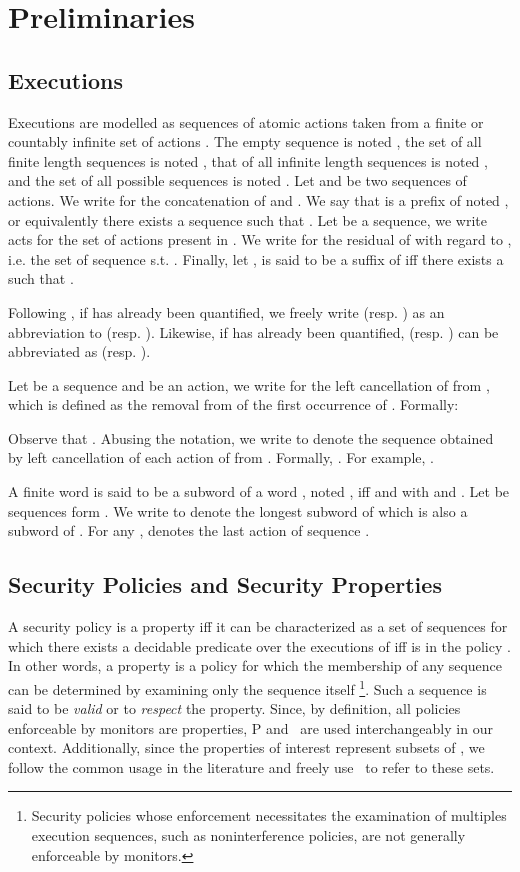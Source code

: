 \documentclass[12pt]{article}
\begin{document}
\section{Preliminaries}\label{sec:preliminaries}

\subsection{Executions}
Executions are modelled as sequences of atomic actions taken from a finite or countably infinite set of actions .  The empty sequence is noted , the set of all finite length sequences is noted , that of all infinite length sequences is noted , and the set of all possible sequences is noted . Let  and  be two sequences of actions.
We write  for the concatenation of  and . We say that  is a prefix of  noted , or equivalently    there exists a sequence  such that . Let  be a sequence, we write acts  for the set of actions  present in . We write  for the residual of  with regard to , i.e. the set of sequence  s.t. . Finally, let ,  is  said to be a suffix of  iff there exists a  such that .

Following \cite{nonsafetyJournal}, if  has already been quantified, we freely write  (resp. ) as an abbreviation to  (resp. ).  Likewise, if  has already been quantified,   (resp. ) can be abbreviated as  (resp. ).

Let  be a sequence and  be an action, we write  for the left cancellation of  from , which is defined as the removal from  of the first occurrence of .  Formally:




Observe that .  Abusing the notation, we write  to denote the sequence obtained by left cancellation of each action of  from . Formally, . For example, .

A finite word  is said to be a subword of a word , noted , iff  and  with  and .  Let  be sequences form . We write  to denote the longest subword of  which is also a subword of . For any ,  denotes the last action of sequence .



\subsection{Security Policies and Security Properties}

A security policy  is a property iff it can be characterized as a set of sequences for which there exists a decidable predicate  over the executions of  iff  is in the policy \cite{enforceable}. In other words, a property is a policy for which the membership of any sequence can be determined by examining only the sequence itself \footnote{Security policies whose enforcement necessitates the examination of multiples execution sequences, such as noninterference policies, are not generally enforceable by monitors.}. Such a sequence is said to be \textit{valid} or to \textit{respect} the property. Since, by definition, all policies enforceable by monitors are properties, P and \Property\ are used interchangeably in our context. Additionally, since the properties of interest represent subsets of , we follow the common usage in the literature and freely use \Property\ to refer to these sets.
\end{document}
